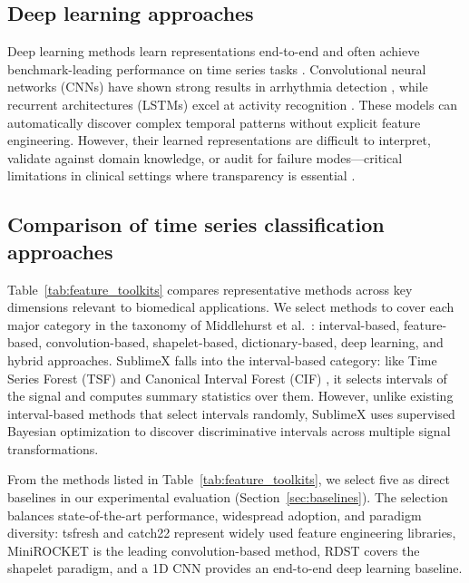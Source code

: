 \documentclass[times, review, 10pt]{elsarticle}
\begin{document}
\subsection{Deep learning approaches}
Deep learning methods learn representations end-to-end and often achieve benchmark-leading performance on time series tasks \cite{miotto2018deep, morid2023time}. Convolutional neural
networks (CNNs) have shown strong results in arrhythmia detection \cite{acharya2017ecg_deep, hannun2019cardiologist}, while recurrent architectures (LSTMs) excel at activity recognition
\cite{ordonez2016deep_activity, hammerla2016deep_activity}. 
These models can automatically discover complex temporal patterns without explicit feature engineering. However, their learned representations are difficult to interpret, 
validate against domain knowledge, or audit for failure modes---critical limitations in clinical settings where transparency is essential \cite{rudin2019stop, tonekaboni2019clinicians, wang2022systematic}.

\subsection{Comparison of time series classification approaches}
Table~\ref{tab:feature_toolkits} compares representative methods
across key dimensions relevant to biomedical applications. We
select methods to cover each major category in the taxonomy of
Middlehurst et al.\ \cite{middlehurst2024bakeoff}: interval-based,
feature-based, convolution-based, shapelet-based, dictionary-based,
deep learning, and hybrid approaches. SublimeX falls into the
interval-based category: like Time Series Forest (TSF)
\cite{deng2013tsf} and Canonical Interval Forest (CIF)
\cite{middlehurst2020cif}, it selects intervals of the signal and
computes summary statistics over them. However, unlike existing
interval-based methods that select intervals randomly, SublimeX
uses supervised Bayesian optimization to discover discriminative
intervals across multiple signal transformations.

From the methods listed in Table~\ref{tab:feature_toolkits}, we
select five as direct baselines in our experimental evaluation
(Section~\ref{sec:baselines}). The selection balances
state-of-the-art performance, widespread adoption, and paradigm
diversity: tsfresh and catch22 represent widely used feature
engineering libraries, MiniROCKET is the leading convolution-based
method, RDST covers the shapelet paradigm, and a 1D CNN provides
an end-to-end deep learning baseline. 
\end{document}
